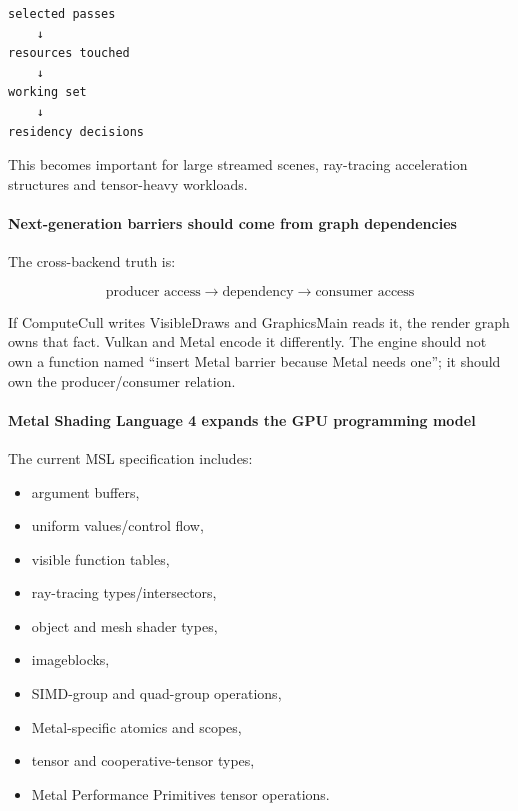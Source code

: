 \begin{verbatim}
selected passes
    ↓
resources touched
    ↓
working set
    ↓
residency decisions
\end{verbatim}

This becomes important for large streamed scenes, ray-tracing acceleration structures and tensor-heavy workloads.

\paragraph{Next-generation barriers should come from graph dependencies}\label{next-generation-barriers-should-come-from-graph-dependencies}

The cross-backend truth is:

\[
\boxed{
\text{producer access}
\rightarrow
\text{dependency}
\rightarrow
\text{consumer access}
}
\]

If ComputeCull writes VisibleDraws and GraphicsMain reads it, the render graph owns that fact. Vulkan and Metal encode it differently. The engine should not own a function named ``insert Metal barrier because Metal needs one''; it should own the producer/consumer relation.

\paragraph{Metal Shading Language 4 expands the GPU programming model}\label{metal-shading-language-4-expands-the-gpu-programming-model}

The current MSL specification includes:

\begin{itemize}
\tightlist
\item
  argument buffers,
\item
  uniform values/control flow,
\item
  visible function tables,
\item
  ray-tracing types/intersectors,
\item
  object and mesh shader types,
\item
  imageblocks,
\item
  SIMD-group and quad-group operations,
\item
  Metal-specific atomics and scopes,
\item
  tensor and cooperative-tensor types,
\item
  Metal Performance Primitives tensor operations.
\end{itemize}

